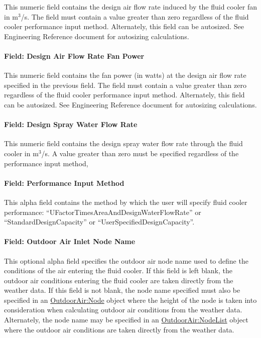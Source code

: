 This numeric field contains the design air flow rate induced by the fluid cooler fan in m\(^{3}\)/s. The field must contain a value greater than zero regardless of the fluid cooler performance input method. Alternately, this field can be autosized. See Engineering Reference document for autosizing calculations.

\paragraph{Field: Design Air Flow Rate Fan Power}\label{field-design-air-flow-rate-fan-power}

This numeric field contains the fan power (in watts) at the design air flow rate specified in the previous field. The field must contain a value greater than zero regardless of the fluid cooler performance input method. Alternately, this field can be autosized. See Engineering Reference document for autosizing calculations.

\paragraph{Field: Design Spray Water Flow Rate}\label{field-design-spray-water-flow-rate}

This numeric field contains the design spray water flow rate through the fluid cooler in m\(^{3}\)/s. A value greater than zero must be specified regardless of the performance input method,

\paragraph{Field: Performance Input Method}\label{field-performance-input-method-3}

This alpha field contains the method by which the user will specify fluid cooler performance: ``UFactorTimesAreaAndDesignWaterFlowRate'' or ``StandardDesignCapacity'' or ``UserSpecifiedDesignCapacity''.

\paragraph{Field: Outdoor Air Inlet Node Name}\label{field-outdoor-air-inlet-node-name-4}

This optional alpha field specifies the outdoor air node name used to define the conditions of the air entering the fluid cooler. If this field is left blank, the outdoor air conditions entering the fluid cooler are taken directly from the weather data. If this field is not blank, the node name specified must also be specified in an \hyperref[outdoorairnode]{OutdoorAir:Node} object where the height of the node is taken into consideration when calculating outdoor air conditions from the weather data. Alternately, the node name may be specified in an \hyperref[outdoorairnodelist]{OutdoorAir:NodeList} object where the outdoor air conditions are taken directly from the weather data.

